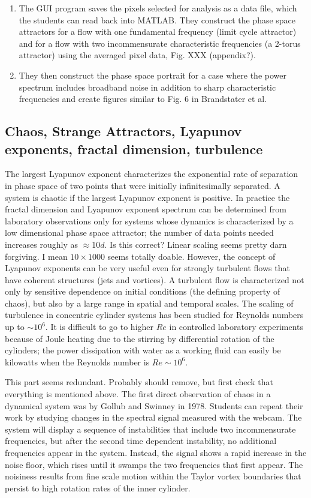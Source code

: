 \documentclass[%
reprint,
 amsmath,amssymb,
 aps,
prb,
floatfix,
longbibliography,
notitlepage
]{revtex4-1}
\newcommand{\DB}[1]{{\color{red}#1}} %
\newcommand{\ReN}{\ensuremath{Re}} %
\begin{document}
\begin{enumerate}
\item The GUI program saves the pixels selected for analysis as a data file, which the students can read back into MATLAB. They construct the phase space attractors for a flow with one fundamental frequency (limit cycle attractor) and for a flow with two incommensurate characteristic frequencies (a 2-torus attractor) using the averaged pixel data, Fig. XXX (appendix?).
\item They then construct the phase space portrait for a case where the power spectrum includes broadband noise in addition to sharp characteristic frequencies and create figures similar to Fig. 6 in Brandstater et al.\cite{brandstater_et_al_1987}
\end{enumerate}

\subsection{Chaos, Strange Attractors, Lyapunov exponents, fractal dimension, turbulence}

The largest Lyapunov exponent characterizes the exponential rate of separation in phase space of two points that were initially infinitesimally separated.  A system is chaotic if the largest Lyapunov exponent is positive.  In practice the fractal dimension and Lyapunov exponent spectrum can be determined from laboratory observations only for systems whose dynamics is characterized by a low dimensional phase space attractor; the number of data points needed increases roughly as $\approx$10$d$. \DB{Is this correct? Linear scaling seems pretty darn forgiving. I mean $10\times1000$ seems totally doable.} However, the concept of Lyapunov exponents can be very useful even for strongly turbulent flows that have coherent structures (jets and vortices). A turbulent flow is characterized not only by sensitive dependence on initial conditions (the defining property of chaos), but also by a large range in spatial and temporal scales. The scaling of turbulence in concentric cylinder systems has been studied for Reynolds numbers up to $\sim10^6$.   It is difficult to go to higher $\ReN$ in controlled laboratory experiments because of Joule heating due to the stirring by differential rotation of the cylinders; the power dissipation with water as a working fluid can easily be kilowatts when the Reynolds number is $\ReN\sim10^6$.

\DB{This part seems redundant. Probably should remove, but first check that everything is mentioned above.} The first direct observation of chaos in a dynamical system was by Gollub and Swinney in 1978.\cite{gollub_swinney} Students can repeat their work by studying changes in the spectral signal measured with the webcam. The system will display a sequence of instabilities that include two incommensurate frequencies, but after the second time dependent instability, no additional frequencies appear in the system. Instead, the signal shows a rapid increase in the noise floor, which rises until it swamps the two frequencies that first appear. The noisiness results from fine scale motion within the Taylor vortex boundaries that persist to high rotation rates of the inner cylinder.
\end{document}
